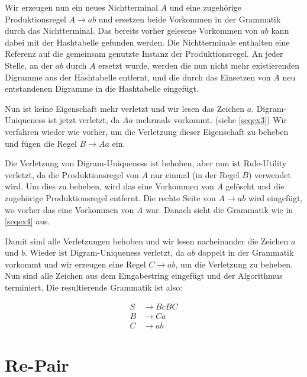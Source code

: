Wir erzeugen nun ein neues Nichtterminal $A$ und eine zugehörige Produktionsregel $A \rightarrow ab$  und ersetzen beide Vorkommen in der Grammatik durch das Nichtterminal. Das bereits vorher gelesene Vorkommen von $ab$ kann dabei mit der Hashtabelle gefunden werden. 
Die Nichtterminale enthalten eine Referenz auf die gemeinsam genutzte Instanz der Produktionsregel. 
An jeder Stelle, an der $ab$ durch $A$ ersetzt wurde, werden die nun nicht mehr existierenden Digramme aus der Hashtabelle entfernt, und die durch das Einsetzen von $A$ neu entstandenen Digramme in die Hashtabelle eingefügt.

Nun ist keine Eigenschaft mehr verletzt und wir lesen das Zeichen $a$. Digram-Uniqueness ist jetzt verletzt, da $Aa$ mehrmals vorkommt. (siehe \autoref{seqex3})
Wir verfahren wieder wie vorher, um die Verletzung dieser Eigenschaft zu beheben und fügen die Regel $B \rightarrow Aa$ ein.

Die Verletzung von Digram-Uniqueness ist behoben, aber nun ist Rule-Utility verletzt, da die Produktionsregel von $A$ nur einmal (in der Regel $B$) verwendet wird.
Um dies zu beheben, wird das eine Vorkommen von $A$ gelöscht und die zugehörige Produktionsregel entfernt. Die rechte Seite von $A \rightarrow ab$ wird eingefügt, wo vorher das eine Vorkommen von $A$ war. Danach sieht die Grammatik wie in \autoref{seqex4} aus.

Damit sind alle Verletzungen behoben und wir lesen nacheinander die Zeichen $a$ und $b$.
Wieder ist Digram-Uniqueness verletzt, da $ab$ doppelt in der Grammatik vorkommt und wir erzeugen eine Regel $C \rightarrow ab$, um die Verletzung zu beheben. Nun sind alle Zeichen aus dem Eingabestring eingefügt und der Algorithmus terminiert. Die resultierende Grammatik ist also:

\begin{align*}
	S &\rightarrow BcBC\\
	B &\rightarrow Ca\\
	C &\rightarrow ab
\end{align*}



\section{Re-Pair}
\label{repair}


